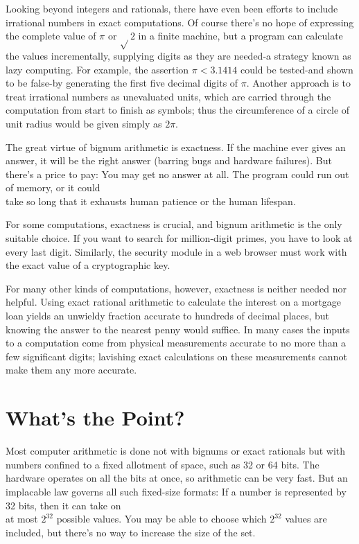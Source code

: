 \documentclass[10pt]{article}
\begin{document}
Looking beyond integers and rationals, there have even been efforts to include irrational numbers in exact computations. Of course there's no hope of expressing the complete value of $\pi$ or $\sqrt{ } 2$ in a finite machine, but a program can calculate the values incrementally, supplying digits as they are needed-a strategy known as lazy computing. For example, the assertion $\pi<3.1414$ could be tested-and shown to be false-by generating the first five decimal digits of $\pi$. Another approach is to treat irrational numbers as unevaluated units, which are carried through the computation from start to finish as symbols; thus the circumference of a circle of unit radius would be given simply as $2 \pi$.

The great virtue of bignum arithmetic is exactness. If the machine ever gives an answer, it will be the right answer (barring bugs and hardware failures). But there's a price to pay: You may get no answer at all. The program could run out of memory, or it could\\
take so long that it exhausts human patience or the human lifespan.

For some computations, exactness is crucial, and bignum arithmetic is the only suitable choice. If you want to search for million-digit primes, you have to look at every last digit. Similarly, the security module in a web browser must work with the exact value of a cryptographic key.

For many other kinds of computations, however, exactness is neither needed nor helpful. Using exact rational arithmetic to calculate the interest on a mortgage loan yields an unwieldy fraction accurate to hundreds of decimal places, but knowing the answer to the nearest penny would suffice. In many cases the inputs to a computation come from physical measurements accurate to no more than a few significant digits; lavishing exact calculations on these measurements cannot make them any more accurate.

\section*{What's the Point?}
Most computer arithmetic is done not with bignums or exact rationals but with numbers confined to a fixed allotment of space, such as 32 or 64 bits. The hardware operates on all the bits at once, so arithmetic can be very fast. But an implacable law governs all such fixed-size formats: If a number is represented by 32 bits, then it can take on\\
at most $2^{32}$ possible values. You may be able to choose which $2^{32}$ values are included, but there's no way to increase the size of the set.
\end{document}
